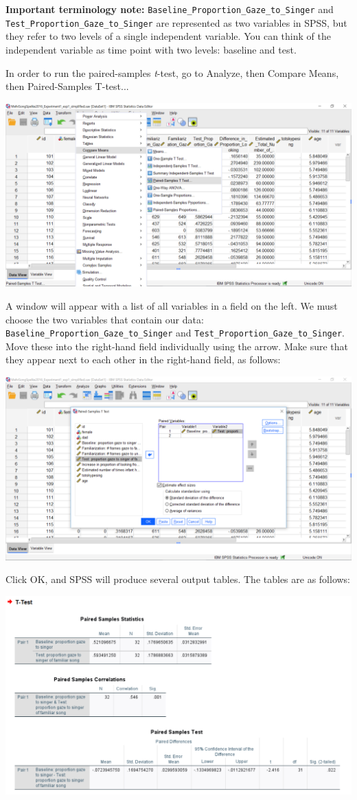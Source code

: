 \documentclass[
]{book}
\begin{document}
\textbf{Important terminology note:} \texttt{Baseline\_Proportion\_Gaze\_to\_Singer} and \texttt{Test\_Proportion\_Gaze\_to\_Singer} are represented as two variables in SPSS, but they refer to two levels of a single independent variable. You can think of the independent variable as time point with two levels: baseline and test.

In order to run the paired-samples \emph{t}-test, go to {Analyze}, then {Compare Means}, then {Paired-Samples T-test..}.

\includegraphics{img/6.4.17.png}

A window will appear with a list of all variables in a field on the left. We must choose the two variables that contain our data: \texttt{Baseline\_Proportion\_Gaze\_to\_Singer} and \texttt{Test\_Proportion\_Gaze\_to\_Singer}. Move these into the right-hand field individually using the arrow. Make sure that they appear next to each other in the right-hand field, as follows:

\includegraphics{img/6.4.18.png}

Click {OK}, and SPSS will produce several output tables. The tables are as follows:

\includegraphics{img/6.4.19.png}
\end{document}
